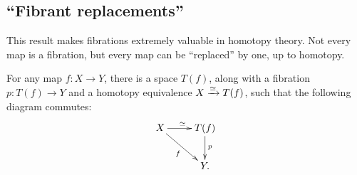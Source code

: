 \subsection{``Fibrant replacements''}
This result makes fibrations extremely valuable in homotopy theory. 
Not every map is a fibration, but every map can be ``replaced'' by one, up
to homotopy.
\begin{theorem}\label{fibrep}
    For any map $f:X\to Y$, there is a space $T(f)$, along with a fibration $p:T(f) \to Y$ and
    a homotopy equivalence $X \xrightarrow{{\simeq}} T(f)$, such that the following diagram
    commutes:
    \begin{equation*}
	\xymatrix{
	    X\ar[r]^{\simeq}\ar[dr]_f & T(f)\ar[d]^p\\
	    & Y.
	    }
    \end{equation*}
\end{theorem}
